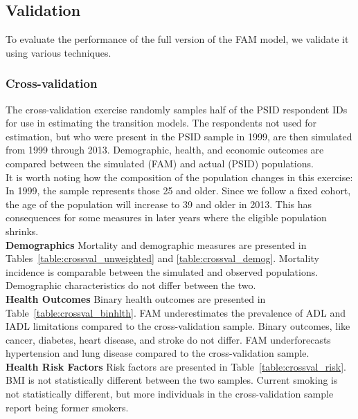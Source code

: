\subsection{Validation}
\noindent To evaluate the performance of the full version of the FAM model, we validate it using various techniques. \\

\subsubsection{Cross-validation}
\noindent The cross-validation exercise randomly samples half of the PSID respondent IDs for use in estimating the transition models. The respondents not used for estimation, but who were present in the PSID sample in 1999, are then simulated from 1999 through 2013. Demographic, health, and economic outcomes are compared between the simulated (FAM) and actual (PSID) populations. \\

\noindent It is worth noting how the composition of the population changes in this exercise: In 1999, the sample represents those 25 and older. Since we follow a fixed cohort, the age of the population will increase to 39 and older in 2013. This has consequences for some measures in later years where the eligible population shrinks.\\

\noindent\textbf{Demographics}
Mortality and demographic measures are presented in Tables~\ref{table:crossval_unweighted} and \ref{table:crossval_demog}. Mortality incidence is comparable between the simulated and observed populations. Demographic characteristics do not differ between the two.\\

\noindent\textbf{Health Outcomes}
Binary health outcomes are presented in Table~\ref{table:crossval_binhlth}. FAM underestimates the prevalence of ADL and IADL limitations compared to the cross-validation sample. Binary outcomes, like cancer, diabetes, heart disease, and stroke do not differ. FAM underforecasts hypertension and lung disease compared to the cross-validation sample.\\

\noindent\textbf{Health Risk Factors}
Risk factors are presented in Table~\ref{table:crossval_risk}. BMI is not statistically different between the two samples. Current smoking is not statistically different, but more individuals in the cross-validation sample report being former smokers.\\

